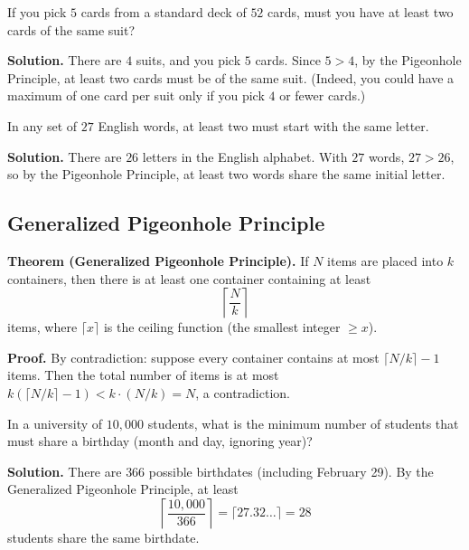 \documentclass[11pt,a4paper]{article}
\begin{document}
\begin{example}
If you pick $5$ cards from a standard deck of $52$ cards, must you have at least two cards of the same suit?

\textbf{Solution.} There are $4$ suits, and you pick $5$ cards. Since $5 > 4$, by the Pigeonhole Principle, at least two cards must be of the same suit. (Indeed, you could have a maximum of one card per suit only if you pick $4$ or fewer cards.)
\end{example}

\begin{example}
In any set of $27$ English words, at least two must start with the same letter.

\textbf{Solution.} There are $26$ letters in the English alphabet. With $27$ words, $27 > 26$, so by the Pigeonhole Principle, at least two words share the same initial letter.
\end{example}

\subsection{Generalized Pigeonhole Principle}

\textbf{Theorem (Generalized Pigeonhole Principle).} If $N$ items are placed into $k$ containers, then there is at least one container containing at least
\begin{equation*}
    \left\lceil \frac{N}{k} \right\rceil
\end{equation*}
items, where $\lceil x \rceil$ is the ceiling function (the smallest integer $\geq x$).

\textbf{Proof.} By contradiction: suppose every container contains at most $\lceil N/k \rceil - 1$ items. Then the total number of items is at most $k(\lceil N/k \rceil - 1) < k \cdot (N/k) = N$, a contradiction.

\begin{example}
In a university of $10{,}000$ students, what is the minimum number of students that must share a birthday (month and day, ignoring year)?

\textbf{Solution.} There are $366$ possible birthdates (including February 29). By the Generalized Pigeonhole Principle, at least
\begin{equation*}
    \left\lceil \frac{10{,}000}{366} \right\rceil = \lceil 27.32\dots \rceil = 28
\end{equation*}
students share the same birthdate.
\end{example}
\end{document}
